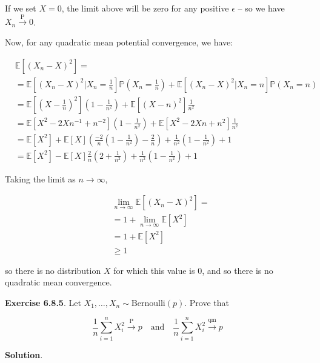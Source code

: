 If we set \(X = 0\), the limit above will be zero for any positive
\(\epsilon\) -- so we have \(X_n \xrightarrow{\text{P}} 0\).

Now, for any quadratic mean potential convergence, we have:

\begin{align}
& \mathbb{E}\left[(X_n - X)^2\right] = \\
& = \mathbb{E}\left[(X_n - X)^2 \bigg| X_n = \frac{1}{n} \right] \mathbb{P}\left(X_n = \frac{1}{n}\right)
   + \mathbb{E}\left[(X_n - X)^2 \big| X_n = n \right] \mathbb{P}\left(X_n = n\right) \\
& = \mathbb{E}\left[\left(X - \frac{1}{n}\right)^2  \right] \left(1 - \frac{1}{n^2}\right)
   + \mathbb{E}\left[(X - n)^2  \right] \frac{1}{n^2} \\
& = \mathbb{E}\left[X^2 - 2Xn^{-1} + n^{-2} \right] \left(1 - \frac{1}{n^2}\right)
   + \mathbb{E}\left[X^2 - 2Xn + n^2 \right] \frac{1}{n^2} \\
& = \mathbb{E}\left[X^2\right] + \mathbb{E}\left[X\right] \left(\frac{-2}{n} \left(1 - \frac{1}{n^2} \right) -\frac{2}{n}\right) + \frac{1}{n^2} \left(1 - \frac{1}{n^2} \right) + 1 \\
& = \mathbb{E}\left[X^2\right] - \mathbb{E}\left[X\right] \frac{2}{n} \left( 2 + \frac{1}{n^2} \right) + \frac{1}{n^2} \left(1 - \frac{1}{n^2} \right) + 1
\end{align}

Taking the limit as \(n \rightarrow \infty\),

\begin{align}
& \lim _{n \rightarrow \infty} \mathbb{E}\left[(X_n - X)^2\right] = \\
& = 1 + \lim _{n \rightarrow \infty} \mathbb{E}\left[X^2\right] \\
& = 1 + \mathbb{E}\left[X^2\right] \\
& \geq 1
\end{align}

so there is no distribution \(X\) for which this value is 0, and so
there is no quadratic mean convergence.

\textbf{Exercise 6.8.5}. Let
\(X_1, \dots, X_n \sim \text{Bernoulli}(p)\). Prove that

\[
\begin{equation}
\frac{1}{n} \sum_{i=1}^n X_i^2 \xrightarrow{\text{P}} p
\quad\mathrm{and}\quad 
\frac{1}{n} \sum_{i=1}^n X_i^2 \xrightarrow{\text{qm}} p
\end{equation}
\]

\textbf{Solution}.

